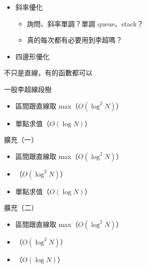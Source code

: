 \begin{frame}{}
    \begin{itemize}
        \item 斜率優化 
         {
            \begin{itemize}
                \item 詢問、斜率單調？單調 queue、stack？
                \item 真的每次都有必要用到李超嗎？
            \end{itemize}
        }
        \item<3> 四邊形優化 
    \end{itemize}

     {
        不只是直線，有的函數都可以
    }
\end{frame}

\begin{frame}{}
    一般李超線段樹

    \begin{itemize}
        \item 區間跟直線取 max（$O(\log^2 N)$）
        \item 單點求值（$O(\log N)$）
    \end{itemize}
\end{frame}

\begin{frame}{}
    擴充（一）

    \begin{itemize}
        \item 區間跟直線取 max（$O(\log^2 N)$）
        \item {}（$O(\log^2 N)$）
        \item 單點求值（$O(\log N)$）
    \end{itemize}

    擴充（二）

    \begin{itemize}
        \item 區間跟直線取 max（$O(\log^2 N)$）
        \item {}（$O(\log^2 N)$）
        \item {}（$O(\log N)$）
    \end{itemize}
\end{frame}

